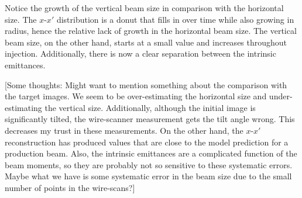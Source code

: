 %
Notice the growth of the vertical beam size in comparison with the horizontal size. The $x$-$x'$ distribution is a donut that fills in over time while also growing in radius, hence the relative lack of growth in the horizontal beam size. The vertical beam size, on the other hand, starts at a small value and increases throughout injection. Additionally, there is now a clear separation between the intrinsic emittances.

[Some thoughts: Might want to mention something about the comparison with the target images. We seem to be over-estimating the horizontal size and under-estimating the vertical size. Additionally, although the initial image is significantly tilted, the wire-scanner measurement gets the tilt angle wrong. This decreases my trust in these measurements. On the other hand, the $x$-$x'$ reconstruction has produced values that are close to the model prediction for a production beam. Also, the intrinsic emittances are a complicated function of the beam moments, so they are probably not so sensitive to these systematic errors. Maybe what we have is some systematic error in the beam size due to the small number of points in the wire-scans?]

